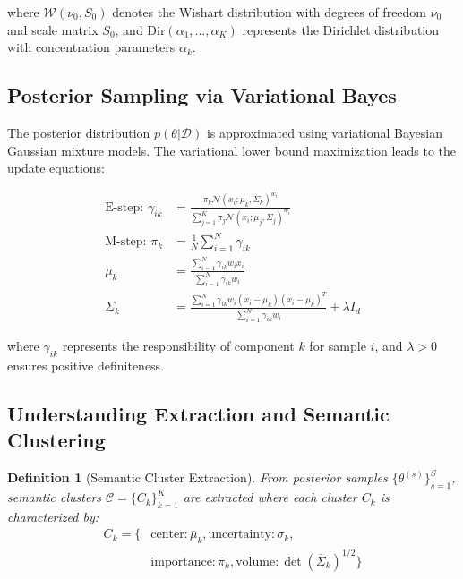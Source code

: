 \documentclass[11pt,a4paper]{article}
\newtheorem{definition}[theorem]{Definition}
\begin{document}
where $\mathcal{W}(\nu_0, S_0)$ denotes the Wishart distribution with degrees of freedom $\nu_0$ and scale matrix $S_0$, and $\text{Dir}(\alpha_1, \ldots, \alpha_K)$ represents the Dirichlet distribution with concentration parameters $\alpha_k$.

\subsection{Posterior Sampling via Variational Bayes}

The posterior distribution $p(\theta|\mathcal{D})$ is approximated using variational Bayesian Gaussian mixture models. The variational lower bound maximization leads to the update equations:

\begin{align}
\text{E-step: } \gamma_{ik} &= \frac{\pi_k \mathcal{N}(x_i; \mu_k, \Sigma_k)^{w_i}}{\sum_{j=1}^K \pi_j \mathcal{N}(x_i; \mu_j, \Sigma_j)^{w_i}} \label{eq:responsibility}\\
\text{M-step: } \pi_k &= \frac{1}{N} \sum_{i=1}^N \gamma_{ik} \label{eq:mixture-update}\\
\mu_k &= \frac{\sum_{i=1}^N \gamma_{ik} w_i x_i}{\sum_{i=1}^N \gamma_{ik} w_i} \label{eq:mean-update}\\
\Sigma_k &= \frac{\sum_{i=1}^N \gamma_{ik} w_i (x_i - \mu_k)(x_i - \mu_k)^T}{\sum_{i=1}^N \gamma_{ik} w_i} + \lambda I_d \label{eq:covariance-update}
\end{align}

where $\gamma_{ik}$ represents the responsibility of component $k$ for sample $i$, and $\lambda > 0$ ensures positive definiteness.

\subsection{Understanding Extraction and Semantic Clustering}

\begin{definition}[Semantic Cluster Extraction]
From posterior samples $\{\theta^{(s)}\}_{s=1}^S$, semantic clusters $\mathcal{C} = \{C_k\}_{k=1}^K$ are extracted where each cluster $C_k$ is characterized by:
\begin{align}
C_k = \{&\text{center}: \bar{\mu}_k, \text{uncertainty}: \sigma_k, \\
&\text{importance}: \bar{\pi}_k, \text{volume}: \det(\bar{\Sigma}_k)^{1/2}\}
\end{align}
\end{definition}
\end{document}
